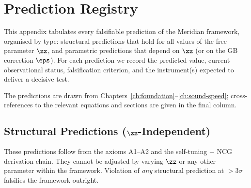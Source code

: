 
\chapter{Prediction Registry}
\label{app:predictions}

This appendix tabulates every falsifiable prediction of the Meridian framework, organised by type: structural predictions that hold for all values of the free parameter $\zz$, and parametric predictions that depend on $\zz$ (or on the GB correction $\eps$). For each prediction we record the predicted value, current observational status, falsification criterion, and the instrument(s) expected to deliver a decisive test.

The predictions are drawn from Chapters~\ref{ch:foundation}--\ref{ch:sound-speed}; cross-references to the relevant equations and sections are given in the final column.

\section{Structural Predictions ($\zz$-Independent)}
\label{app:pred-structural}

These predictions follow from the axioms A1--A2 and the self-tuning + NCG derivation chain. They cannot be adjusted by varying $\zz$ or any other parameter within the framework. Violation of \emph{any} structural prediction at $>3\sigma$ falsifies the framework outright.

